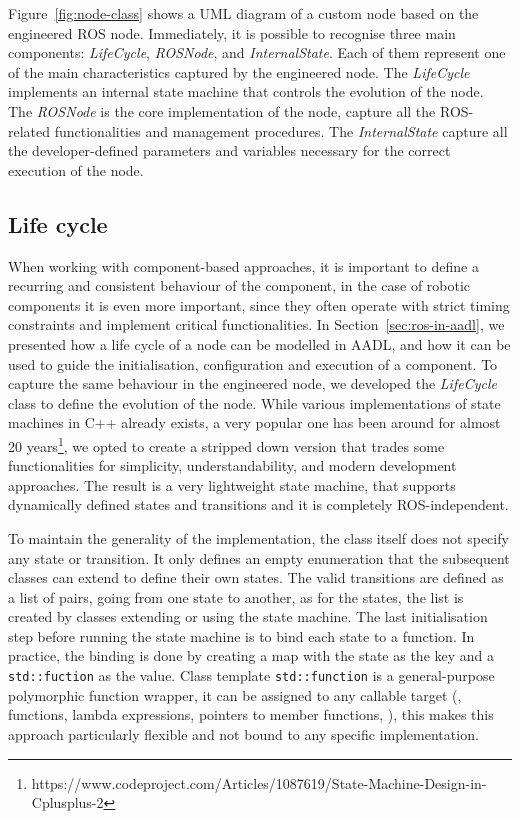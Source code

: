 Figure~\ref{fig:node-class} shows a UML diagram of a custom node based on the engineered ROS node. Immediately, it is possible to recognise three main components: \textit{LifeCycle}, \textit{ROSNode}, and \textit{InternalState}. Each of them represent one of the main characteristics captured by the engineered node. The \textit{LifeCycle} implements an internal state machine that controls the evolution of the node. The \textit{ROSNode} is the core implementation of the node, capture all the ROS-related functionalities and management procedures. The \textit{InternalState} capture all the developer-defined parameters and variables necessary for the correct execution of the node.

\subsection{Life cycle}
When working with component-based approaches, it is important to define a recurring and consistent behaviour of the component, in the case of robotic components it is even more important, since they often operate with strict timing constraints and implement critical functionalities. In Section~\ref{sec:ros-in-aadl}, we presented how a life cycle of a node can be modelled in AADL, and how it can be used to guide the initialisation, configuration and execution of a component. To capture the same behaviour in the engineered node, we developed the \textit{LifeCycle} class to define the evolution of the node. While various implementations of state machines in C++ already exists, a very popular one has been around for almost 20 years\footnote{https://www.codeproject.com/Articles/1087619/State-Machine-Design-in-Cplusplus-2}, we opted to create a stripped down version that trades some functionalities for simplicity, understandability, and modern development approaches. The result is a very lightweight state machine, that supports dynamically defined states and transitions and it is completely ROS-independent.

To maintain the generality of the implementation, the class itself does not specify any state or transition. It only defines an empty enumeration that the subsequent classes can extend to define their own states. The valid transitions are defined as a list of pairs, going from one state to another, as for the states, the list is created by classes extending or using the state machine. The last initialisation step before running the state machine is to bind each state to a function. In practice, the binding is done by creating a map with the state as the key and a \texttt{std::fuction} as the value. Class template \texttt{std::function} is a general-purpose polymorphic function wrapper, it can be assigned to any callable target (\eg, functions, lambda expressions, pointers to member functions, \etc), this makes this approach particularly flexible and not bound to any specific implementation. 

